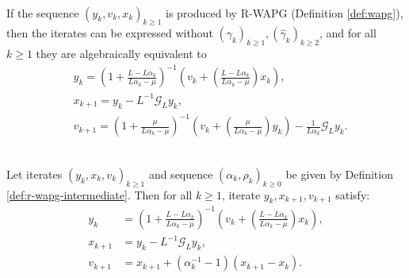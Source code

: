 \documentclass[12pt]{article}
\begin{document}
        \begin{proposition}\label{prop:wapg-first-equivalent-repr}\;\\
            If the sequence $(y_k, v_k, x_k)_{k \ge 1}$ is produced by R-WAPG (Definition \ref{def:wapg}), 
            then the iterates can be expressed without $(\gamma_k)_{k \ge1},(\hat \gamma_k)_{k \ge 2}$, and for all $k\ge 1$ they are algebraically equivalent to
            \begin{align*}
                & 
                y_{k} = 
                \left(
                    1 + \frac{L - L\alpha_{k}}{L\alpha_{k} - \mu}
                \right)^{-1}
                \left(
                    v_{k} + 
                    \left(\frac{L - L\alpha_{k}}{L\alpha_{k} - \mu} \right) x_{k}
                \right), 
                \\
                & x_{k + 1} = 
                y_k - L^{-1} \mathcal G_L y_k, 
                \\
                & v_{k + 1} = 
                \left(
                    1 + \frac{\mu}{L \alpha_k - \mu}
                \right)^{-1}
                \left(
                    v_k + 
                    \left(\frac{\mu}{L \alpha_k - \mu}\right) y_k
                \right) - \frac{1}{L\alpha_{k}}\mathcal G_L y_k. 
            \end{align*}
        \end{proposition}
        \begin{proposition}\label{prop:wagp-st-form}\;\\
            Let iterates $(y_k, x_{k}, v_{k})_{k \ge 1}$ and sequence $(\alpha_k, \rho_k)_{k \ge 0}$ be given by Definition \ref{def:r-wapg-intermediate}. 
            Then for all $k \ge 1$, iterate $y_k, x_{k + 1}, v_{k + 1}$
            satisfy: 
            \begin{align*}
                y_{k} &= 
                \left(
                    1 + \frac{L - L\alpha_{k}}{L\alpha_{k} - \mu}
                \right)^{-1}
                \left(
                    v_{k} + 
                    \left(\frac{L - L\alpha_{k}}{L\alpha_{k} - \mu} \right) x_{k}
                \right), 
                \\
                x_{k + 1} &= 
                y_k - L^{-1} \mathcal G_L y_k, 
                \\
                v_{k + 1} &= x_{k + 1} + (\alpha_k^{-1} - 1)(x_{k + 1} - x_k). 
            \end{align*}
        \end{proposition}
\end{document}
